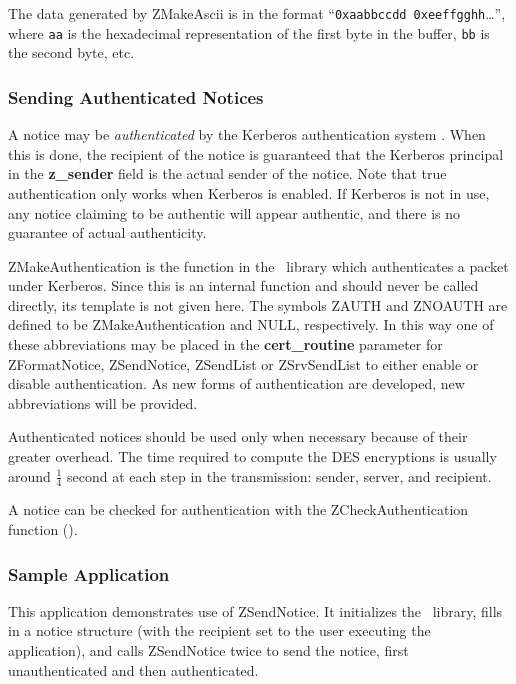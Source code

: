 The data generated by ZMakeAscii is in the format ``{\tt 0xaabbccdd
0xeeffgghh}\ldots'', where {\tt aa} is the hexadecimal representation
of the first byte in the buffer, {\tt bb} is the second byte, etc.

\subsubsection{Sending Authenticated Notices}
\label{authenticated-notices}

A notice may be {\em authenticated\/} by the Kerberos authentication
system \cite{kerberos-paper}.
When this is done, the recipient of the notice is guaranteed that the
Kerberos principal in the {\bf z_sender} field is the actual sender
of the notice.  Note that true authentication only works when
Kerberos is enabled.  If Kerberos is not in use, any notice claiming to
be authentic will appear authentic, and there is no guarantee of actual
authenticity.

ZMakeAuthentication is the function in the \Zephyr\ library which
authenticates a packet under Kerberos.  Since this is an internal
function and should never be called directly, its template is not given
here.  The symbols ZAUTH and ZNOAUTH are defined to be
ZMakeAuthentication and NULL, respectively.  In this way one of these
abbreviations may be placed in the {\bf cert_routine} parameter for
ZFormatNotice, ZSendNotice, ZSendList or ZSrvSendList to either enable
or disable authentication.  As new forms of authentication are
developed, new abbreviations will be provided.

Authenticated notices should be used only when necessary because of
their greater overhead.  The time required to compute the DES
encryptions is usually around $\frac{1}{4}$ second at each step in the
transmission: sender, server, and recipient.

A notice can be checked for authentication with the
ZCheckAuthentication function ().

\subsubsection{Sample Application}

This application demonstrates use of ZSendNotice.
It initializes the \Zephyr\ library, fills in a
notice structure (with the recipient set to the user executing the
application), and calls ZSendNotice twice to send the notice, first
unauthenticated and then authenticated.

